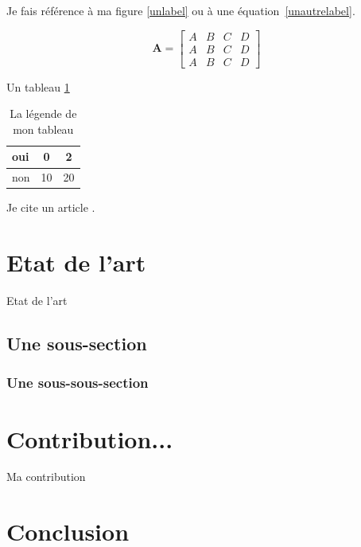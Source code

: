 \documentclass[10pt]{article}
\begin{document}
Je fais référence à ma figure \ref{unlabel} ou à une équation~\ref{unautrelabel}.

\begin{equation}
    \mathbf{A}=\begin{bmatrix}
        A&B&C&D\\
        A&B&C&D\\
        A&B&C&D
    \end{bmatrix}
    \label{encoreunlabel}
\end{equation}

Un tableau \ref{labeldemontableau}
\begin{table}[htp]
    \centering
    \begin{tabular}{l|c|c}
        oui&0&2\\\hline
        non&10&20
    \end{tabular}
    \caption{La légende de mon tableau}
    \label{labeldemontableau}
\end{table}

Je cite un article \cite{AAC08a}.
\section{Etat de l'art}

Etat de l'art
\subsection{Une sous-section}
\subsubsection{Une sous-sous-section}
\section{Contribution...}

Ma contribution
\section{Conclusion}
\end{document}
